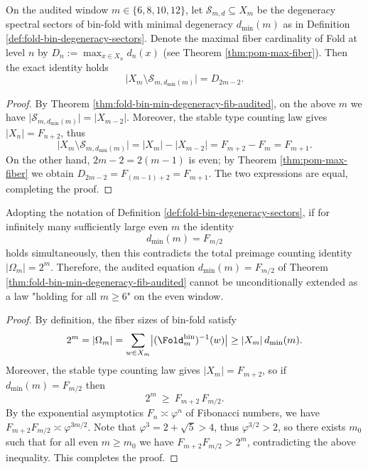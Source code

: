 \begin{corollary}\label{cor:fold-bin-minsector-complement-maxfiber-audited}
On the audited window \(m\in\{6,8,10,12\}\), let \(\mathcal{S}_{m,d}\subseteq X_m\) be the degeneracy spectral sectors of bin-fold with minimal degeneracy \(d_{\min}(m)\) as in Definition \ref{def:fold-bin-degeneracy-sectors}.
Denote the maximal fiber cardinality of Fold at level \(n\) by
\(
D_n:=\max_{x\in X_n} d_n(x)
\)
(see Theorem \ref{thm:pom-max-fiber}).
Then the exact identity holds
\[
\bigl|X_m\setminus \mathcal{S}_{m,d_{\min}(m)}\bigr| = D_{2m-2}.
\]
\end{corollary}
\begin{proof}
By Theorem \ref{thm:fold-bin-min-degeneracy-fib-audited}, on the above \(m\) we have \(\bigl|\mathcal{S}_{m,d_{\min}(m)}\bigr|=|X_{m-2}|\).
Moreover, the stable type counting law gives \(|X_n|=F_{n+2}\), thus
\[
\bigl|X_m\setminus \mathcal{S}_{m,d_{\min}(m)}\bigr|
=|X_m|-|X_{m-2}|
=F_{m+2}-F_m
=F_{m+1}.
\]
On the other hand, \(2m-2=2(m-1)\) is even; by Theorem \ref{thm:pom-max-fiber} we obtain
\(
D_{2m-2}=F_{(m-1)+2}=F_{m+1}
\).
The two expressions are equal, completing the proof.
\end{proof}

\begin{corollary}\label{cor:fold-bin-min-degeneracy-fib-nonpersistent}
Adopting the notation of Definition \ref{def:fold-bin-degeneracy-sectors},
if for infinitely many sufficiently large even \(m\) the identity
\[
d_{\min}(m)=F_{m/2}
\]
holds simultaneously, then this contradicts the total preimage counting identity \(|\Omega_m|=2^m\).
Therefore, the audited equation \(d_{\min}(m)=F_{m/2}\) of Theorem \ref{thm:fold-bin-min-degeneracy-fib-audited} cannot be unconditionally extended as a law "holding for all \(m\ge 6\)" on the even window.
\end{corollary}
\begin{proof}
By definition, the fiber sizes of bin-fold satisfy
\[
2^m
=|\Omega_m|
=\sum_{w\in X_m}\bigl|(\Fold_m^{\mathrm{bin}})^{-1}(w)\bigr|
\ge |X_m|\,d_{\min}(m).
\]
Moreover, the stable type counting law gives \(|X_m|=F_{m+2}\), so if \(d_{\min}(m)=F_{m/2}\) then
\[
2^m\ \ge\ F_{m+2}\,F_{m/2}.
\]
By the exponential asymptotics \(F_n\asymp \varphi^n\) of Fibonacci numbers, we have \(F_{m+2}F_{m/2}\asymp \varphi^{3m/2}\).
Note that \(\varphi^3=2+\sqrt5>4\), thus \(\varphi^{3/2}>2\), so there exists \(m_0\) such that for all even \(m\ge m_0\) we have \(F_{m+2}F_{m/2}>2^m\), contradicting the above inequality. This completes the proof.
\end{proof}

